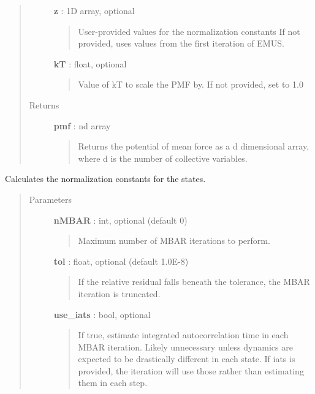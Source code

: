 \documentclass[letterpaper,10pt,english]{sphinxmanual}
\begin{document}
\begin{fulllineitems}
\begin{fulllineitems}
\begin{quote}
\begin{description}
\textbf{z} : 1D array, optional
\begin{quote}

User-provided values for the normalization constants If not provided, uses values from the first iteration of EMUS.
\end{quote}

\textbf{kT} : float, optional
\begin{quote}

Value of kT to scale the PMF by.  If not provided, set to 1.0
\end{quote}

\item[{Returns}] \leavevmode
\textbf{pmf} : nd array
\begin{quote}

Returns the potential of mean force as a d dimensional array, where d is the number of collective variables.
\end{quote}

\end{description}\end{quote}

\end{fulllineitems}


\begin{fulllineitems}
\label{modules/emus:emus.emus.calc_zs}
Calculates the normalization constants for the states.
\begin{quote}\begin{description}
\item[{Parameters}] \leavevmode
\textbf{nMBAR} : int, optional (default 0)
\begin{quote}

Maximum number of MBAR iterations to perform.
\end{quote}

\textbf{tol} : float, optional (default 1.0E-8)
\begin{quote}

If the relative residual falls beneath the tolerance, the MBAR iteration is truncated.
\end{quote}

\textbf{use\_iats} : bool, optional
\begin{quote}

If true, estimate integrated autocorrelation time in each MBAR iteration.  Likely unnecessary unless dynamics are expected to be drastically different in each state. If iats is provided, the iteration will use those rather than estimating them in each step.
\end{quote}


\end{description}
\end{quote}
\end{fulllineitems}
\end{fulllineitems}
\end{document}
